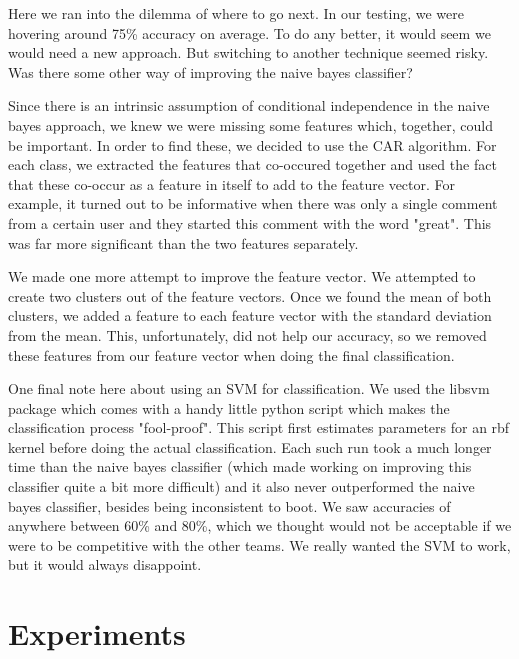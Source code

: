 \documentclass[]{report}
\begin{document}
Here we ran into the dilemma of where to go next.  In our testing, we were hovering around 75\% accuracy on average.  To do any better, it would seem we would need a new approach.  But switching to another technique seemed risky.  Was there some other way of improving the naive bayes classifier?

Since there is an intrinsic assumption of conditional independence in the naive bayes approach, we knew we were missing some features which, together, could be important.  In order to find these, we decided to use the CAR algorithm.  For each class, we extracted the features that co-occured together and used the fact that these co-occur as a feature in itself to add to the feature vector.  For example, it turned out to be informative when there was only a single comment from a certain user and they started this comment with the word "great".  This was far more significant than the two features separately.

We made one more attempt to improve the feature vector.  We attempted to create two clusters out of the feature vectors.  Once we found the mean of both clusters, we added a feature to each feature vector with the standard deviation from the mean.  This, unfortunately, did not help our accuracy, so we removed these features from our feature vector when doing the final classification.

One final note here about using an SVM for classification.  We used the libsvm package which comes with a handy little python script which makes the classification process "fool-proof".  This script first estimates parameters for an rbf kernel before doing the actual classification.  Each such run took a much longer time than the naive bayes classifier (which made working on improving this classifier quite a bit more difficult) and it also never outperformed the naive bayes classifier, besides being inconsistent to boot.  We saw accuracies of anywhere between 60\% and 80\%, which we thought would not be acceptable if we were to be competitive with the other teams.  We really wanted the SVM to work, but it would always disappoint.

\section{Experiments}
\end{document}
